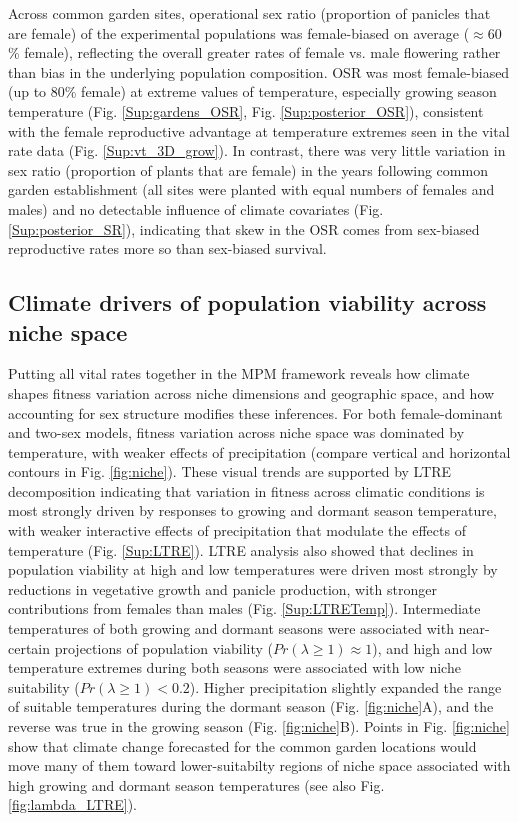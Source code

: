 \documentclass[12pt]{article}\usepackage[]{graphicx}\usepackage[dvipsnames]{xcolor}
\begin{document}
Across common garden sites, operational sex ratio (proportion of panicles that are female) of the experimental populations was female-biased on average ($\approx 60$ \% female), reflecting the overall greater rates of female vs. male flowering rather than bias in the underlying population composition. 
OSR was most female-biased (up to 80\% female) at extreme values of temperature, especially growing season temperature (Fig. \ref{Sup:gardens_OSR}, Fig. \ref{Sup:posterior_OSR}), consistent with the female reproductive advantage at temperature extremes seen in the vital rate data (Fig. \ref{Sup:vt_3D_grow}). 
In contrast, there was very little variation in sex ratio (proportion of plants that are female) in the years following common garden establishment (all sites were planted with equal numbers of females and males) and no detectable influence of climate covariates (Fig. \ref{Sup:posterior_SR}), indicating that skew in the OSR comes from sex-biased reproductive rates more so than sex-biased survival. 


\subsection*{Climate drivers of population viability across niche space}
Putting all vital rates together in the MPM framework reveals how climate shapes fitness variation across niche dimensions and geographic space, and how accounting for sex structure modifies these inferences. 
For both female-dominant and two-sex models, fitness variation across niche space was dominated by temperature, with weaker effects of precipitation (compare vertical and horizontal contours in Fig. \ref{fig:niche}). 
These visual trends are supported by LTRE decomposition indicating that variation in fitness across climatic conditions is most strongly driven by responses to growing and dormant season temperature, with weaker interactive effects of precipitation that modulate the effects of temperature (Fig. \ref{Sup:LTRE}). 
LTRE analysis also showed that declines in population viability at high and low temperatures were driven most strongly by reductions in vegetative growth and panicle production, with stronger contributions from females than males (Fig. \ref{Sup:LTRETemp}). 
Intermediate temperatures of both growing and dormant seasons were associated with near-certain projections of population viability ($Pr(\lambda \ge 1) \approx 1$), and high and low temperature extremes during both seasons were associated with low niche suitability ($Pr(\lambda \ge 1) < 0.2$). 
Higher precipitation slightly expanded the range of suitable temperatures during the dormant season (Fig. \ref{fig:niche}A), and the reverse was true in the growing season (Fig. \ref{fig:niche}B). 
Points in Fig. \ref{fig:niche} show that climate change forecasted for the common garden locations would move many of them toward lower-suitabilty regions of niche space associated with high growing and dormant season temperatures (see also Fig. \ref{fig:lambda_LTRE}).
\end{document}
